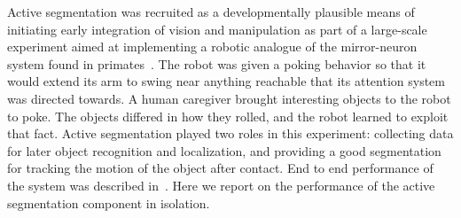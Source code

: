 Active segmentation was recruited as a developmentally plausible means
of initiating early integration of vision and manipulation as part of
a large-scale experiment aimed at implementing a robotic analogue of
the mirror-neuron system found in primates~\cite{self02omit}.  The
robot was given a poking behavior so that it would extend its arm to
swing near anything reachable that its attention system was directed
towards.  A human caregiver brought interesting objects to the robot
to poke.  The objects differed in how they rolled, and the robot
learned to exploit that fact.  Active segmentation played two roles in
this experiment: collecting data for later object recognition and
localization, and providing a good segmentation for tracking the
motion of the object after contact.  End to end performance of the
system was described in~\cite{self02omit}.  Here we report on the
performance of the active segmentation component in isolation.
